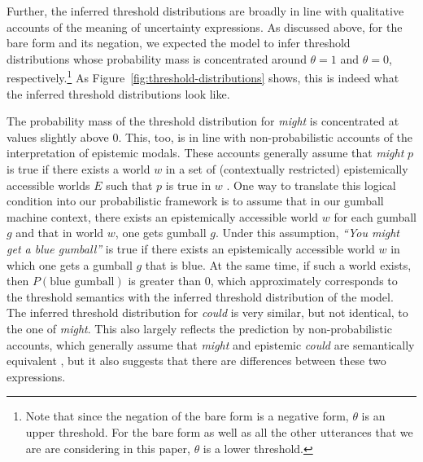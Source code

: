 Further, the inferred threshold distributions are broadly in line with qualitative accounts of the meaning of uncertainty expressions.
As discussed above, for the bare form and its negation, we expected the model to infer threshold distributions whose probability mass is concentrated 
around $\theta=1$ and $\theta=0$, respectively.\footnote{Note that since the negation of the bare form is a negative form, $\theta$ is an upper threshold. For the bare form as well as
all the other utterances that we are are considering in this paper, $\theta$ is a lower threshold.} As  Figure~\ref{fig:threshold-distributions} shows, this is indeed what
the inferred threshold distributions look like. 


The probability mass of the threshold distribution for \textit{might} is  concentrated at values slightly above 0. This, too, 
is in line with non-probabilistic accounts of the interpretation of epistemic modals. These accounts generally assume that \textit{might} $p$ is true 
if there exists a world $w$ in a set of (contextually restricted) epistemically accessible worlds $E$ such that $p$ is true in $w$ 
\cite[e.g.,][]{Kratzer1991,Swanson2008,Hacquard2011}. One way to translate this logical condition into our probabilistic framework is to assume that 
in our gumball machine context, there exists an epistemically accessible world $w$ for each gumball $g$ and that in world $w$, one gets gumball $g$. 
Under this assumption, \textit{``You might get a blue gumball''} is true if there exists an epistemically accessible world $w$  in which one gets a
gumball $g$ that is blue. At the same time, if such a world exists, then $P(\mbox{blue gumball})$ is greater than 0, which approximately corresponds
to the threshold semantics with the inferred threshold distribution of the model. The inferred threshold distribution for \textit{could} is very similar, 
but not identical, to the one of \textit{might}. This also largely reflects the prediction by non-probabilistic accounts, which generally assume that \textit{might} and epistemic 
\textit{could} are semantically equivalent \cite{Kratzer1991,Hacquard2011}, but it also suggests that there are differences between these two expressions. 

